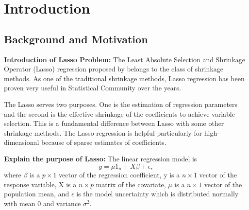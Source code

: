 \chapter{Introduction}
\label{Chapter1}
\section{Background and Motivation}




\textbf{Introduction of Lasso Problem:}
The Least Absolute Selection and Shrinkage Operator (Lasso) regression proposed by \cite{tibshirani_1996} belongs to the class of shrinkage methods. As one of the traditional shrinkage methods, Lasso regression has been proven very useful in Statistical Community over the years. 

The Lasso serves two purposes. One is the estimation of regression parameters and the second is the effective shrinkage of the coefficients to achieve variable selection. This is a fundamental difference between Lasso with some other shrinkage methods. The Lasso regression is helpful particularly for high-dimensional because of  sparse estimates of coefficients. 

\noindent \textbf{Explain the purpose of Lasso:}
The linear regression model is
\begin{equation}
	\label{eq:LRmodel}
	y = \mu 1_n + X\beta + \epsilon,
\end{equation} 
where $\beta$ is a $p\times 1$ vector of the regression coefficient, y is a $n \times 1$ vector of the response variable, X is a $n \times p$ matrix of the covariate, $\mu$ is a $n\times 1$ vector of the population mean, and $\epsilon$ is the model uncertainty which is distributed normally with mean 0 and variance $\sigma^2$. 

